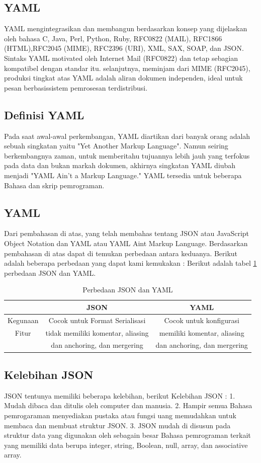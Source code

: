 \documentclass[a4paper]{article}
\begin{document}
\subsection{YAML}
YAML mengintegrasikan dan membangun berdasarkan konsep yang dijelaskan oleh bahasa C, Java, Perl, Python, Ruby, RFC0822 (MAIL), RFC1866 (HTML),RFC2045 (MIME), RFC2396 (URI), XML, SAX, SOAP, dan JSON.
Sintaks YAML motivated oleh Internet Mail (RFC0822) dan tetap sebagian kompatibel dengan standar itu. selanjutnya, meminjam dari MIME (RFC2045), produksi tingkat atas YAML adalah aliran dokumen independen, ideal untuk pesan berbasissistem pemrosesan terdistribusi.
\subsection{Definisi YAML}
Pada saat awal-awal perkembangan, YAML diartikan dari banyak orang adalah sebuah singkatan yaitu "Yet Another Markup Language". Namun seiring berkembangnya zaman, untuk memberitahu tujuannya lebih jauh yang terfokus pada data dan bukan markah dokumen, akhirnya singkatan YAML diubah menjadi "YAML Ain't a Markup Language." YAML tersedia untuk beberapa Bahasa dan skrip pemrograman.
\subsection{YAML}
Dari pembahasan di atas, yang telah membahas tentang JSON atau JavaScript Object Notation dan YAML atau YAML Aint Markup Language. Berdasarkan pembahasan di atas dapat di temukan perbedaan antara keduanya. Berikut adalah beberapa perbedaan yang dapat kami kemukakan :
Berikut adalah tabel \ref{table:perbedaan} perbedaan JSON dan YAML.
\begin{table}[h]
\caption{Perbedaan JSON dan YAML}

\centering
\begin{tabular}{ccc}
\hline
&JSON&YAML\\
\hline
Kegunaan&Cocok untuk Format Serialisasi&Cocok untuk konfigurasi\\
\hline
Fitur&tidak memiliki komentar, aliasing&memiliki komentar, aliasing \\
&dan anchoring, dan  mergering& dan anchoring, dan  mergering\\
\hline
\end{tabular}
\label{table:perbedaan}
\end{table}

\subsection{Kelebihan JSON}
JSON tentunya memiliki beberapa kelebihan, berikut Kelebihan JSON :
1.	Mudah dibaca dan ditulis oleh computer dan manusia.
2.	Hampir semua Bahasa pemrogaraman menyediakan pustaka atau fungsi uang memudahkan untuk membaca dan membuat struktur JSON.
3.	JSON mudah di disusun pada struktur data yang digunakan oleh sebagain besar Bahasa pemrograman terkait yang memiliki data berupa integer, string, Boolean, null, array, dan associative array.
\end{document}
